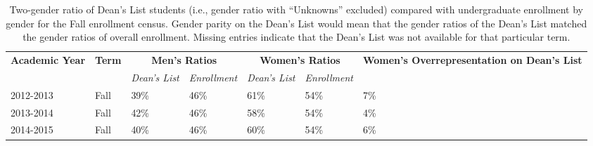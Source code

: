 \documentclass[10]{article}
\begin{document}
\begin{longtable}[c]{|l|l|ll|ll|l|}
	\caption{Two-gender ratio of Dean's List students (i.e., gender ratio with ``Unknowns'' excluded) compared with undergraduate enrollment by gender for the Fall enrollment census. Gender parity on the Dean's List would mean that the gender ratios of the Dean's List matched the gender ratios of overall enrollment.  Missing entries indicate that the Dean's List was not available for that particular term.}
	\label{tab:gender-benchmark}\\
	\hline
	\multicolumn{1}{|c|}{\multirow{2}{*}{\textbf{Academic Year}}} & \multicolumn{1}{c|}{\multirow{2}{*}{\textbf{Term}}} & \multicolumn{2}{c|}{\textbf{Men's Ratios}}                                           & \multicolumn{2}{c|}{\textbf{Women's Ratios}}                                         & \multicolumn{1}{c|}{\multirow{2}{*}{\parbox{1.75in}{\textbf{Women's Overrepresentation on Dean's List}}}} \\ \cline{3-6}
	\multicolumn{1}{|c|}{}                                        & \multicolumn{1}{c|}{}                               & \multicolumn{1}{c|}{\textit{Dean's List}} & \multicolumn{1}{c|}{\textit{Enrollment}} & \multicolumn{1}{c|}{\textit{Dean's List}} & \multicolumn{1}{c|}{\textit{Enrollment}} & \multicolumn{1}{c|}{}                                                                    \\ \hline
	\endhead
	2012-2013                                                     & Fall                                                & \multicolumn{1}{l|}{39\%}                 & 46\%                                     & \multicolumn{1}{l|}{61\%}                 & 54\%                                     & 7\%                                                                                      \\ \hline
	2013-2014                                                     & Fall                                                & \multicolumn{1}{l|}{42\%}                 & 46\%                                     & \multicolumn{1}{l|}{58\%}                 & 54\%                                     & 4\%                                                                                      \\ \hline
	2014-2015                                                     & Fall                                                & \multicolumn{1}{l|}{40\%}                 & 46\%                                     & \multicolumn{1}{l|}{60\%}                 & 54\%                                     & 6\%                                                                                      \\ \hline

\end{longtable}
\end{document}

